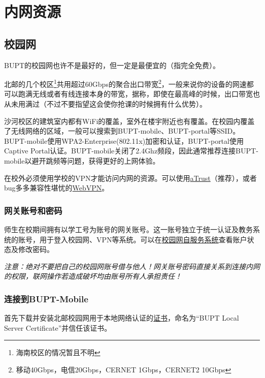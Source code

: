 \section{内网资源}

\subsection{校园网}

BUPT的校园网也许不是最好的，但一定是最便宜的（指完全免费）。

北邮的几个校区\footnote{海南校区的情况暂且不明}共用超过60Gbps的聚合出口带宽\footnote{移动40Gbps，电信20Gbps，CERNET 1Gbps，CERNET2 10Gbps}，一般来说你的设备的网速都可以跑满无线或者有线连接本身的带宽，据称，即使在最高峰的时候，出口带宽也从未用满过（不过不要指望这会使你抢课的时候拥有什么优势）。

沙河校区的建筑室内都有WiFi的覆盖，室外在楼宇附近也有覆盖。在校园内覆盖了无线网络的区域，一般可以搜索到BUPT-mobile、BUPT-portal等SSID。BUPT-mobile使用WPA2-Enterprise(802.11x)加密和认证，BUPT-portal使用Captive Portal认证。BUPT-mobile关闭了2.4Ghz频段，因此通常推荐连接BUPT-mobile以避开跳频等问题，获得更好的上网体验。

在校外必须使用学校的VPN才能访问内网的资源。可以使用\href{https://vpn.bupt.edu.cn/}{aTrust}（推荐），或者bug多多兼容性堪忧的\href{https://webvpn.bupt.edu.cn/}{WebVPN}。

\subsubsection*{网关账号和密码}

师生在校期间拥有以学工号为账号的网关账号。这一账号独立于统一认证及教务系统的账号，用于登入校园网、VPN等系统。可以在\href{https://netaccount.bupt.edu.cn/}{校园网自服务系统}查看账户状态及修改密码。

\emph{注意：绝对不要把自己的校园网账号借与他人！网关账号密码直接关系到连接内网的权限，联网操作若造成破坏均由账号所有人承担责任！}

\subsubsection*{连接到BUPT-Mobile}

首先下载并安装北邮校园网用于本地网络认证的\href{https://github.com/FredericDT/BUPTCampusNetworkManual/blob/master/Wireless/XTC-BUPT-mobile-assets/BUPT-Local-Server-Certificate.crt}{证书}，命名为“BUPT Local Server Certificate”并信任该证书。

